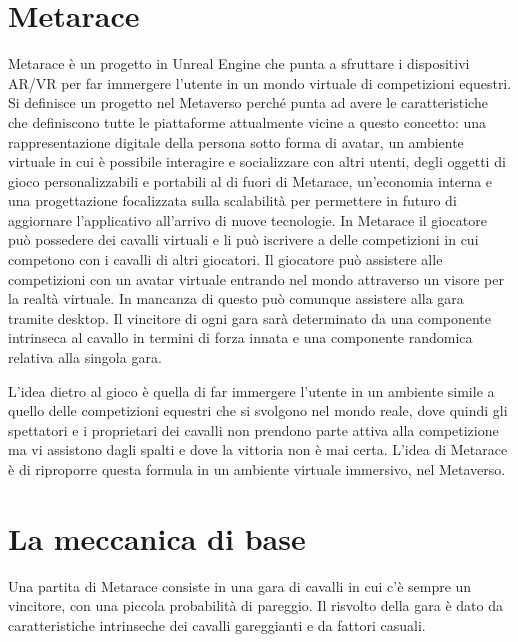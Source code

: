 
\section{Metarace}

    Metarace è un progetto in Unreal Engine che punta a sfruttare i dispositivi AR/VR per far immergere l'utente in un mondo virtuale di competizioni equestri.
    Si definisce un progetto nel Metaverso perché punta ad avere le caratteristiche che definiscono tutte le piattaforme attualmente vicine a questo concetto: una rappresentazione digitale della persona sotto forma di avatar, un ambiente virtuale in cui è possibile interagire e socializzare con altri utenti, degli oggetti di gioco personalizzabili e portabili al di fuori di Metarace, un'economia interna e una progettazione focalizzata sulla scalabilità per permettere in futuro di aggiornare l'applicativo all'arrivo di nuove tecnologie.
    In Metarace il giocatore può possedere dei cavalli virtuali e li può iscrivere a delle competizioni in cui competono con i cavalli di altri giocatori.
    Il giocatore può assistere alle competizioni con un avatar virtuale entrando nel mondo attraverso un visore per la realtà virtuale. 
    In mancanza di questo può comunque assistere alla gara tramite desktop. 
    Il vincitore di ogni gara sarà determinato da una componente intrinseca al cavallo in termini di forza innata e una componente randomica relativa alla singola gara.

    L'idea dietro al gioco è quella di far immergere l'utente in un ambiente simile a quello delle competizioni equestri che si svolgono nel mondo reale, dove quindi gli spettatori e i proprietari dei cavalli non prendono parte attiva alla competizione ma vi assistono dagli spalti e dove la vittoria non è mai certa. 
    L'idea di Metarace è di riproporre questa formula in un ambiente virtuale immersivo, nel Metaverso.

\section{La meccanica di base}

    Una partita di Metarace consiste in una gara di cavalli in cui c'è sempre un vincitore, con una piccola probabilità di pareggio.
    Il risvolto della gara è dato da caratteristiche intrinseche dei cavalli gareggianti e da fattori casuali.

